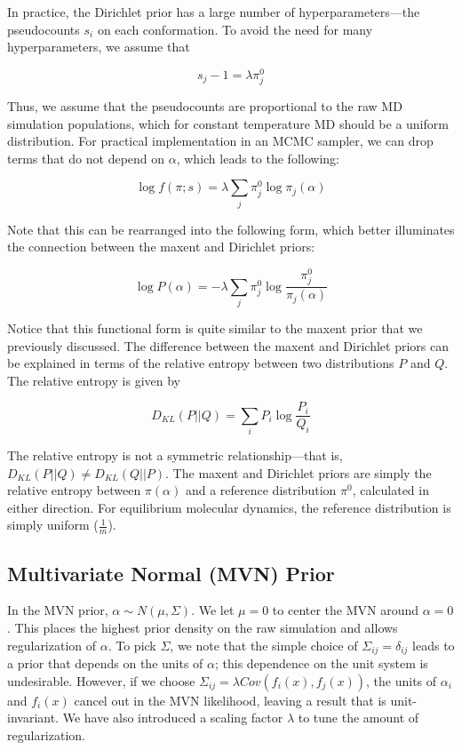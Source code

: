 \documentclass[12pt]{article}
\begin{document}
In practice, the Dirichlet prior has a large number of hyperparameters---the pseudocounts $s_i$ on each conformation.  To avoid the need for many hyperparameters, we assume that 

$$s_j - 1 = \lambda \pi_j^0$$

Thus, we assume that the pseudocounts are proportional to the raw MD simulation populations, which for constant temperature MD should be a uniform distribution.  For practical implementation in an MCMC sampler, we can drop terms that do not depend on $\alpha$, which leads to the following:

$$\log f(\pi;s) =  \lambda \sum_j \pi_j^0 \log \pi_j(\alpha)$$

Note that this can be rearranged into the following form, which better illuminates the connection between the maxent and Dirichlet priors:

$$\log P(\alpha) = -\lambda \sum_j \pi_j^0 \log \frac{\pi_j^0}{\pi_j(\alpha)}$$

Notice that this functional form is quite similar to the maxent prior that we previously discussed.  The difference between the maxent and Dirichlet priors can be explained in terms of the relative entropy between two distributions $P$ and $Q$.  The relative entropy is given by

$$D_{KL}(P||Q) = \sum_i P_i \log \frac{P_i}{Q_i}$$

The relative entropy is not a symmetric relationship---that is, $D_{KL}(P||Q) \ne D_{KL}(Q||P)$.  The maxent and Dirichlet priors are simply the relative entropy between $\pi(\alpha)$ and a reference distribution $\pi^0$, calculated in either direction.    For equilibrium molecular dynamics, the reference distribution is simply uniform ($\frac{1}{m}$).


\subsection*{Multivariate Normal (MVN) Prior}

In the MVN prior, $\alpha \sim N(\mu,\Sigma)$.  We let $\mu = 0$ to center the MVN around $\alpha = 0$.  This places the highest prior density on the raw simulation and allows regularization of $\alpha$.  To pick $\Sigma$, we note that the simple choice of $\Sigma_{ij} = \delta_{ij}$ leads to a prior that depends on the units of $\alpha$; this dependence on the unit system is undesirable.  However, if we choose $\Sigma_{ij} = \lambda Cov(f_i(x), f_j(x))$, the units of $\alpha_i$ and $f_i(x)$ cancel out in the MVN likelihood, leaving a result that is unit-invariant.  We have also introduced a scaling factor $\lambda$ to tune the amount of regularization.
\end{document}
